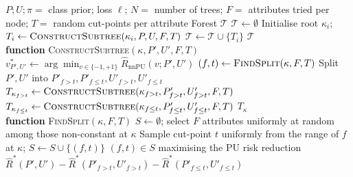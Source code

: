 \documentclass{article}
\begin{document}
\begin{algorithm}[!h]
\renewcommand{\algorithmicrequire}{\textbf{Input:}} %
\renewcommand{\algorithmicensure}{\textbf{Output:}} %
	\caption{PU ET (PU extra trees by recursive greedy risk minimization)} %
	\begin{algorithmic}[1] %
	    \REQUIRE
	    $P;U;\pi=$ class prior; loss $\ell$; $N=$ number of trees; $F=$ attributes tried per node;
	    $T=$ random cut-points per attribute
	    \ENSURE
	    Forest $\mathcal{T}$
	    \STATE $\mathcal{T}\leftarrow \emptyset$
	    \STATE Initialise root $\kappa_{i}$; $T_{i}\leftarrow \textsc{ConstructSubtree}(\kappa_{i},P,U,F,T)$
	    \STATE $\mathcal{T}\leftarrow \mathcal{T}\cup\{T_{i}\}$
	    \ENDFOR
	    \RETURN $\mathcal{T}$
	    \\\hrulefill
	    \STATE \textbf{function} \textsc{ConstructSubtree}$(\kappa,P',U',F,T)$
	    \STATE $v_{P',U'}^{\ast}\leftarrow \arg\min_{v\in\{-1,+1\}}\hat{R}_{\mathrm{nnPU}}(v;P',U')$ %
	    \ELSE
	    \STATE $(f,t)\leftarrow \textsc{FindSplit}(\kappa,F,T)$
	    \STATE Split $P',U'$ into $P'_{f>t},P'_{f\leq t},U'_{f>t},U'_{f\leq t}$
	    \STATE $T_{\kappa_{f>t}}\leftarrow \textsc{ConstructSubtree}(\kappa_{f>t},P'_{f>t},U'_{f>t},F,T)$
	    \STATE $T_{\kappa_{f\leq t}}\leftarrow \textsc{ConstructSubtree}(\kappa_{f\leq t},P'_{f\leq t},U'_{f\leq t},F,T)$
	    \ENDIF
	    \RETURN $T_{\kappa}$
	    \\\hrulefill
	    \STATE \textbf{function} \textsc{FindSplit}$(\kappa,F,T)$
	    \STATE $S\leftarrow \emptyset$; select $F$ attributes uniformly at random among those non-constant at $\kappa$
	    \STATE Sample cut-point $t$ uniformly from the range of $f$ at $\kappa$; $S\leftarrow S\cup\{(f,t)\}$ %
	    \ENDFOR
	    \ENDFOR
	    \RETURN $(f,t)\in S$ maximising the PU risk reduction
	    $\hat{R}^{\ast}(P',U')-\hat{R}^{\ast}(P'_{f>t},U'_{f>t})-\hat{R}^{\ast}(P'_{f\leq t},U'_{f\leq t})$
	\end{algorithmic}
\end{algorithm}
\end{document}
